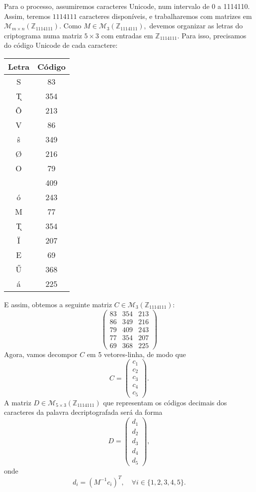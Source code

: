 \documentclass[oneside,a4paper,12pt]{article}
\newcommand{\AS}[1]{{\fontencoding{T4}\selectfont#1}}
\theoremstyle{definition}
\theoremstyle{plain}
\theoremstyle{solu}
\theoremstyle{dotlessP}
\begin{document}
Para o processo, assumiremos caracteres Unicode, num intervalo de 0 a 1114110. Assim, teremos $1114111$ caracteres disponíveis, e trabalharemos com matrizes em $\mathcal{M}_{m \times n}(\mathbb{Z}_{1114111}).$ Como $M \in \mathcal{M}_3(\mathbb{Z}_{1114111}),$ devemos organizar as letras do criptograma numa matriz $5 \times 3$ com entradas em $\mathbb{Z}_{1114111}$. Para isso, precisamos do código Unicode de cada caractere:
\begin{center}
\begin{tabular}{|c|c|}
\hline
Letra   & Código \\ \hline
    S   &  83 \\ \hline
\k{T}   &  354\\ \hline
\~{O}   &  213 \\ \hline
V       &  86 \\ \hline
\^{s}   &  349\\ \hline
\AS{\O} &  216\\ \hline
O       &  79    \\ \hline
\AS{\m{k}} & 409    \\ \hline
ó       & 243 \\ \hline
M       & 77  \\ \hline
\k{T}   & 354  \\ \hline
\"{I}   &  207 \\ \hline
E       &  69  \\ \hline
\H{U}   &  368  \\ \hline
á       &   225 \\ \hline
\end{tabular}
\end{center}
E assim, obtemos a seguinte matriz $C \in \mathcal{M}_3(\mathbb{Z}_{1114111}):$
\[
\begin{pmatrix}
83 & 354 & 213  \\ 
86 & 349 & 216  \\ 
79 & 409 & 243  \\
77 & 354  &  207 \\
69 & 368 & 225
\end{pmatrix}
\]
Agora, vamos decompor $C$ em 5 vetores-linha, de modo que
\[
C = \begin{pmatrix}
c_1 \\
c_2 \\
c_3 \\
c_4 \\
c_5
\end{pmatrix}.\]
A matriz $D \in \mathcal{M}_{5 \times 3}(\mathbb{Z}_{1114111})$ que representam os códigos decimais dos caracteres da palavra decriptografada será da forma 
\[
D = \begin{pmatrix}
d_1 \\
d_2 \\
d_3 \\
d_4 \\
d_5
\end{pmatrix},\]
onde 
\[
d_i = (M^{-1} c_i)^T, \quad \forall i \in \{1, 2, 3, 4, 5 \}.
\]
\end{document}
